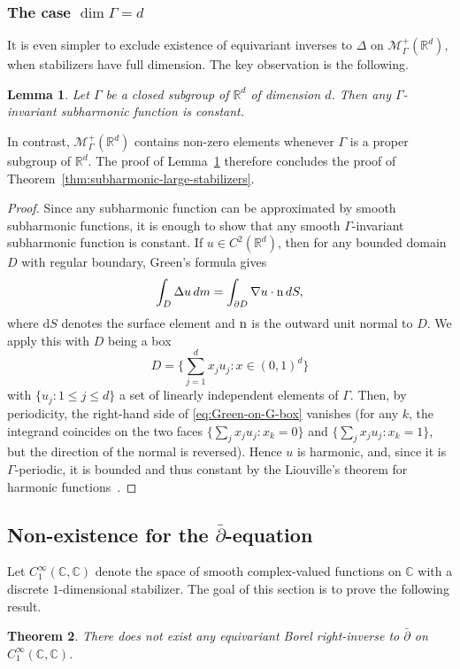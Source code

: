 \documentclass[12pt]{paper}
\numberwithin{equation}{section}
\theoremstyle{plain}
\newtheorem{theorem}{Theorem}[section]
\newtheorem{lemma}[theorem]{Lemma}
\theoremstyle{definition}
\newcommand{\C}{\mathbb{C}}
\newcommand{\Rd}{\mathbb{R}^{d}}
\newcommand{\smooth}[2][]{C^{\infty}_{#1}(#2)}
\newcommand{\measp}[2][]{\mathcal{M}_{#1}^+(#2)}
\begin{document}
\subsubsection{The case \texorpdfstring{\(\dim \Gamma = d\)}{dim = d}}
\noindent It is even simpler to exclude existence of equivariant inverses to \(\Delta\) on
\(\measp[\Gamma]{\Rd}\), when stabilizers have full dimension.  The key observation is the
following.

\begin{lemma}
  \label{lem:non-exist-SH-fulldim}
  Let \(\Gamma\) be a closed subgroup of \(\Rd\) of dimension \(d\).  Then any \(\Gamma\)-invariant
  subharmonic function is constant.
\end{lemma}

In contrast, \(\measp[\Gamma]{\Rd}\) contains non-zero elements whenever \(\Gamma\) is a proper
subgroup of \(\Rd\).  The proof of Lemma~\ref{lem:non-exist-SH-fulldim} therefore concludes the
proof of Theorem~\ref{thm:subharmonic-large-stabilizers}.

\begin{proof}
  Since any subharmonic function can be approximated by smooth subharmonic functions, it is enough
  to show that any smooth \(\Gamma\)-invariant subharmonic function is constant. If
  \(u\in C^2(\Rd)\), then for any bounded domain \(D\) with regular boundary, Green's formula gives
  \begin{equation}
    \label{eq:Green-on-G-box}
    \int_{D} \Delta u\,dm=\int_{\partial D}\nabla u\cdot {\rm n}\,dS,
  \end{equation}
  where \(\mathrm{d}S\) denotes the surface element and \({\rm n}\) is the outward unit normal to
  \(D\). We apply this with \(D\) being a box
  \[
    D=\biggl\{\sum_{j=1}^d x_ju_j: x\in (0,1)^d\biggr\}
  \]
  with \(\{u_j:1\le j\le d\}\) a set of linearly independent elements of \(\Gamma\). Then, by
  periodicity, the right-hand side of \eqref{eq:Green-on-G-box} vanishes (for any \(k\), the
  integrand coincides on the two faces \(\{\sum_j x_ju_j:x_k=0\}\) and \(\{\sum_j x_ju_j:x_k=1\}\),
  but the direction of the normal is reversed).  Hence \(u\) is harmonic, and, since it is
  \(\Gamma\)-periodic, it is bounded and thus constant by the Liouville's theorem for harmonic
  functions~\cite{nelsonProofLiouvillesTheorem1961}.
\end{proof}

\subsection[Non-existence of the d-bar equation]{Non-existence for the
  \texorpdfstring{\(\bar\partial\)-equation}{Non-existence of the d-bar equation}}
\label{s:d-bar}
\noindent Let \(\smooth[1]{\C,\C}\) denote the space of smooth complex-valued functions on
\(\C\) with a discrete \(1\)-dimensional stabilizer. The goal of this section is to prove
the following result.
\begin{theorem}
  \label{thm:non-exist-dbar}
  There does not exist any equivariant Borel right-inverse to \(\bar\partial\) on
  \(\smooth[1]{\C,\C}\).
\end{theorem}
\end{document}
